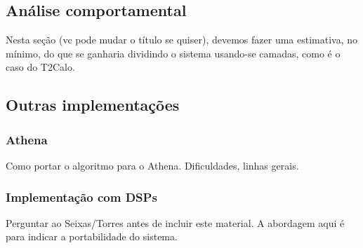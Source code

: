 \subsection{Análise comportamental}

Nesta seção (vc pode mudar o título se quiser), devemos fazer uma estimativa,
no mínimo, do que se ganharia dividindo o sistema usando-se camadas, como é o
caso do T2Calo.

\subsection{Outras implementações}

\subsubsection{Athena}

Como portar o algoritmo para o Athena. Dificuldades, linhas gerais.

\subsubsection{Implementação com DSPs}

Perguntar ao Seixas/Torres antes de incluir este material. A abordagem aqui é
para indicar a portabilidade do sistema.


